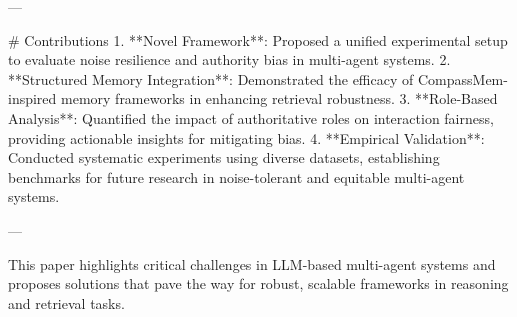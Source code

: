 ---

# Contributions  
1. **Novel Framework**: Proposed a unified experimental setup to evaluate noise resilience and authority bias in multi-agent systems.  
2. **Structured Memory Integration**: Demonstrated the efficacy of CompassMem-inspired memory frameworks in enhancing retrieval robustness.  
3. **Role-Based Analysis**: Quantified the impact of authoritative roles on interaction fairness, providing actionable insights for mitigating bias.  
4. **Empirical Validation**: Conducted systematic experiments using diverse datasets, establishing benchmarks for future research in noise-tolerant and equitable multi-agent systems.  

--- 

This paper highlights critical challenges in LLM-based multi-agent systems and proposes solutions that pave the way for robust, scalable frameworks in reasoning and retrieval tasks.